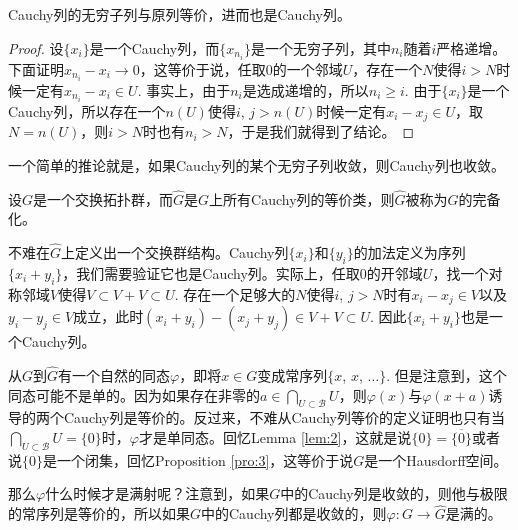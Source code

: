 \begin{lem}
	Cauchy列的无穷子列与原列等价，进而也是Cauchy列。
\end{lem}

\begin{proof}
	设$\{x_i\}$是一个Cauchy列，而$\{x_{n_i}\}$是一个无穷子列，其中$n_i$随着$i$严格递增。下面证明$x_{n_i}-x_i\to 0$，这等价于说，任取$0$的一个邻域$U$，存在一个$N$使得$i>N$时候一定有$x_{n_i}-x_{i}\in U$. 事实上，由于$n_i$是选成递增的，所以$n_i\geq i$. 由于$\{x_i\}$是一个Cauchy列，所以存在一个$n(U)$使得$i$, $j>n(U)$时候一定有$x_i-x_j\in U$，取$N=n(U)$，则$i>N$时也有$n_i>N$，于是我们就得到了结论。
\end{proof}

一个简单的推论就是，如果Cauchy列的某个无穷子列收敛，则Cauchy列也收敛。

\begin{para}
	设$G$是一个交换拓扑群，而$\hat G$是$G$上所有Cauchy列的等价类，则$\hat G$被称为$G$的完备化。

	不难在$\hat G$上定义出一个交换群结构。Cauchy列$\{x_i\}$和$\{y_i\}$的加法定义为序列$\{x_i+y_i\}$，我们需要验证它也是Cauchy列。实际上，任取$0$的开邻域$U$，找一个对称邻域$V$使得$V\subset V+V\subset U$. 存在一个足够大的$N$使得$i$, $j>N$时有$x_i-x_j\in V$以及$y_i-y_j\in V$成立，此时$(x_i+y_i)-(x_j+y_j)\in V+V\subset U$. 因此$\{x_i+y_i\}$也是一个Cauchy列。

	从$G$到$\hat G$有一个自然的同态$\varphi$，即将$x\in G$变成常序列$\{x$, $x$, $\dots\}$. 但是注意到，这个同态可能不是单的。因为如果存在非零的$a\in\bigcap_{U\subset \mathscr{B}}U$，则$\varphi(x)$与$\varphi(x+a)$诱导的两个Cauchy列是等价的。反过来，不难从Cauchy列等价的定义证明也只有当$\bigcap_{U\subset \mathscr{B}}U=\{0\}$时，$\varphi$才是单同态。回忆Lemma \ref{lem:2}，这就是说$\{0\}=\overline{\{0\}}$或者说$\{0\}$是一个闭集，回忆Proposition \ref{pro:3}，这等价于说$G$是一个Hausdorff空间。

	那么$\varphi$什么时候才是满射呢？注意到，如果$G$中的Cauchy列是收敛的，则他与极限的常序列是等价的，所以如果$G$中的Cauchy列都是收敛的，则$\varphi:G\to \hat{G}$是满的。
\end{para}

